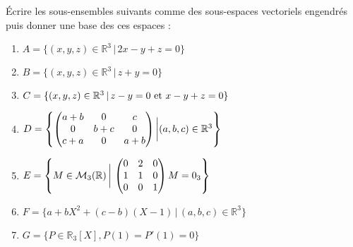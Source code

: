 \documentclass[a4paper,10pt]{report}
\begin{document}
\begin{Exercice}{}Écrire les sous-ensembles suivants comme des sous-espaces vectoriels engendrés puis donner une base des ces espaces :

\begin{multicols}{2}
\begin{enumerate}
\item $A=\lbrace (x,y,z) \in \mathbb{R}^3 \, \vert  \, 2x-y+z=0 \rbrace$
\item $B= \lbrace (x,y,z) \in \mathbb{R}^3 \, \vert \, z+y=0 \rbrace$
\item $C= \lbrace (x,y,z) \in \mathbb{R}^3 \, \vert \, z-y=0 \hbox{ et } x-y+z=0 \rbrace$

\item $D = \left\lbrace \begin{pmatrix}
a+b & 0 & c \\
0 & b+c & 0 \\
c+a & 0& a+b 
\end{pmatrix} \bigg{\vert} (a,b,c) \in \mathbb{R}^3 \right\rbrace$

\columnbreak
\item $E = \left\lbrace M \in \mathcal{M}_3(\mathbb{R}) \, \bigg{\vert} \, \begin{pmatrix}
0 & 2 & 0 \\
1 & 1 & 0 \\
0 & 0 & 1 
\end{pmatrix} M=0_3 \right\rbrace$
\item $F= \lbrace a + bX^2 + (c-b)(X-1) \, \vert \, (a,b,c) \in \mathbb{R}^3 \rbrace$
\item $G = \lbrace P \in \mathbb{R}_3[X], P(1)=P'(1)=0 \rbrace$
\end{enumerate}
\end{multicols}

\vspace{0.05cm}
\end{Exercice}

\corr 
\end{document}
